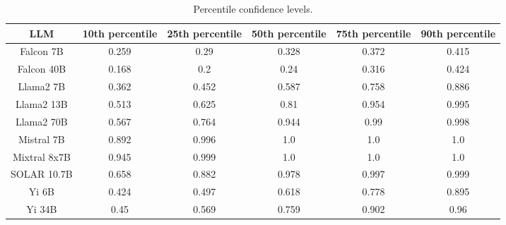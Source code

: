 \begin{table*}
\centering
\begin{tabular}{c|c|c|c|c|c}
LLM & 10th percentile & 25th percentile & 50th percentile & 75th percentile & 90th percentile\\ \hline
Falcon 7B & 0.259 & 0.29 & 0.328 & 0.372 & 0.415\\
Falcon 40B & 0.168 & 0.2 & 0.24 & 0.316 & 0.424\\
Llama2 7B & 0.362 & 0.452 & 0.587 & 0.758 & 0.886\\
Llama2 13B & 0.513 & 0.625 & 0.81 & 0.954 & 0.995\\
Llama2 70B & 0.567 & 0.764 & 0.944 & 0.99 & 0.998\\
Mistral 7B & 0.892 & 0.996 & 1.0 & 1.0 & 1.0\\
Mixtral 8x7B & 0.945 & 0.999 & 1.0 & 1.0 & 1.0\\
SOLAR 10.7B & 0.658 & 0.882 & 0.978 & 0.997 & 0.999\\
Yi 6B & 0.424 & 0.497 & 0.618 & 0.778 & 0.895\\
Yi 34B & 0.45 & 0.569 & 0.759 & 0.902 & 0.96\\
\hline
\end{tabular}
\caption{Percentile confidence levels.}
\label{tab:percentile_conf}
\end{table*}
